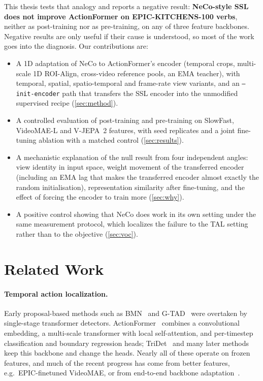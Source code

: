 \documentclass[10pt,a4paper]{article}
\begin{document}
This thesis tests that analogy and reports a negative result: \textbf{NeCo-style SSL does
not improve ActionFormer on EPIC-KITCHENS-100 verbs}, neither as post-training nor as
pre-training, on any of three feature backbones. Negative results are only useful if
their cause is understood, so most of the work goes into the diagnosis. Our contributions are:
\begin{itemize}\setlength\itemsep{0pt}
\item A 1D adaptation of NeCo to ActionFormer's encoder (temporal crops, multi-scale
  1D ROI-Align, cross-video reference pools, an EMA teacher), with temporal, spatial,
  spatio-temporal and frame-rate view variants, and an \texttt{--init-encoder} path that
  transfers the SSL encoder into the unmodified supervised recipe (\cref{sec:method}).
\item A controlled evaluation of post-training and pre-training on SlowFast, VideoMAE-L and
  V-JEPA~2 features, with seed replicates and a joint fine-tuning ablation with a matched
  control (\cref{sec:results}).
\item A mechanistic explanation of the null result from four independent angles: view
  identity in input space, weight movement of the transferred encoder (including an EMA
  lag that makes the transferred encoder almost exactly the random initialisation),
  representation similarity after fine-tuning, and the effect of forcing the encoder to
  train more (\cref{sec:why}).
\item A positive control showing that NeCo does work in its own setting under the same
  measurement protocol, which localizes the failure to the TAL setting rather than to
  the objective (\cref{sec:voc}).
\end{itemize}

\section{Related Work}

\paragraph{Temporal action localization.}
Early proposal-based methods such as BMN~\cite{lin2019bmn} and
G-TAD~\cite{xu2020gtad} were overtaken by single-stage transformer detectors.
ActionFormer~\cite{zhang2022actionformer} combines a convolutional embedding, a
multi-scale transformer with local self-attention, and per-timestep classification and
boundary regression heads; TriDet~\cite{shi2023tridet} and many later methods keep this
backbone and change the heads. Nearly all of these operate on frozen features, and much
of the recent progress has come from better features, e.g.\ EPIC-finetuned VideoMAE, or from
end-to-end backbone adaptation~\cite{liu2024adatad,liu2025opentad}.
\end{document}
